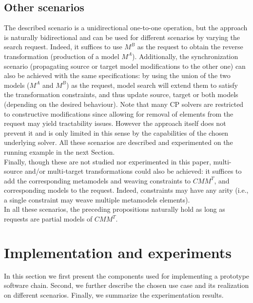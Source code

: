 \documentclass{llncs}
\begin{document}
\subsection{Other scenarios}
%
The described scenario is a unidirectional one-to-one operation, but the approach is naturally bidirectional and can be used for different scenarios by varying the search request. Indeed, it suffices to use
$M^B$ as the request to obtain the reverse transformation (production of a model $M^A$). Additionally,
the synchronization scenario (propagating source or target model modifications to the
other one) can also be achieved with the same specifications: by using the union of the two models ($M^A$
and $M^B$) as the request, model search will extend them
to satisfy the transformation constraints, and thus update source,
target or both models (depending on the desired behaviour). Note that many CP solvers are restricted to constructive modifications since allowing for removal of elements from the request may yield tractability issues. However the approach itself does not prevent it and is only limited in this sense by the capabilities of the chosen underlying solver. All these scenarios are described and experimented on the running example in the next Section.\\
Finally, though these are not studied nor experimented in this paper, multi-source and/or multi-target transformations could also be achieved: it suffices to add the corresponding metamodels and weaving constraints to $CMM^T$, and corresponding models to the request. Indeed, constraints may have any arity (i.e., a single constraint may weave multiple metamodels elements).\\
In all these scenarios, the preceding propositions naturally hold as long as requests are partial models of $CMM^T$.
%
\section{Implementation and experiments}
\label{sec:validation}

In this section we first present the components used for implementing a prototype software chain. Second, we further describe the chosen use case and its realization on different scenarios. Finally, we summarize the experimentation results.
\end{document}

